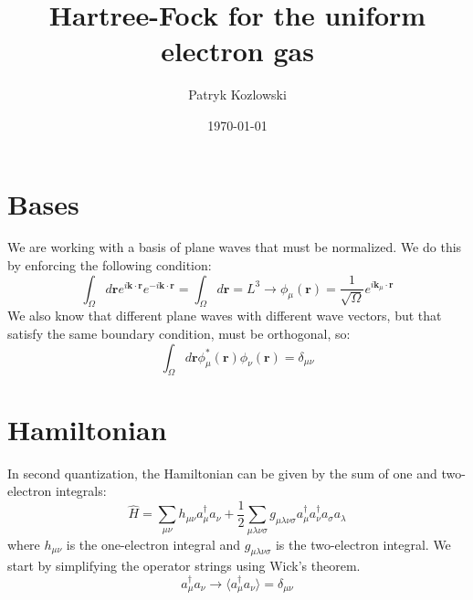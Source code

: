 \documentclass[12pt]{article}
\author{Patryk Kozlowski}
\title{Hartree-Fock for the uniform electron gas}
\date{\today}
\begin{document}
\maketitle
\section{Bases}
We are working with a basis of plane waves that must be normalized. We do this by enforcing the following condition:
\begin{equation}
    \int_{\Omega } d\mathbf{r} e^{i\mathbf{k}\cdot\mathbf{r}} e^{-i\mathbf{k}\cdot\mathbf{r}} = \int_{\Omega }d\mathbf{r} = L^3 \rightarrow \phi_\mu(\mathbf{r}) = \frac{1}{\sqrt{\Omega }} e^{i\mathbf{k}_\mu\cdot\mathbf{r}}
\end{equation}
We also know that different plane waves with different wave vectors, but that satisfy the same boundary condition, must be orthogonal, so:
\begin{equation}
    \int_{\Omega } d\mathbf{r} \phi^*_\mu(\mathbf{r}) \phi_\nu(\mathbf{r}) = \delta_{\mu\nu}
\end{equation}

\section{Hamiltonian}
In second quantization, the Hamiltonian can be given by the sum of one and two-electron integrals:
\begin{equation}
    \hat{H} = \sum_{\mu\nu} h_{\mu\nu} a^\dagger_\mu a_\nu + \frac{1}{2} \sum_{\mu\lambda\nu\sigma} g_{\mu\lambda\nu\sigma} a^\dagger_\mu a^\dagger_\nu a_\sigma a_\lambda
\end{equation}
where $h_{\mu\nu}$ is the one-electron integral and $g_{\mu\lambda\nu\sigma}$ is the two-electron integral. We start by simplifying the operator strings using Wick's theorem. 
\begin{equation}
   a^\dagger_\mu a_\nu \rightarrow \langle a^\dagger_\mu a_\nu \rangle = \delta_{\mu\nu}
\end{equation}
\end{document}
